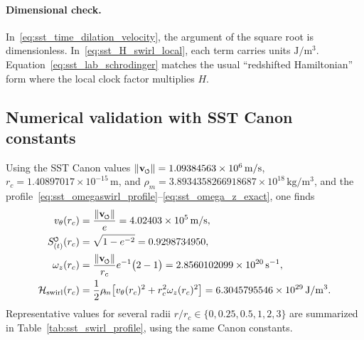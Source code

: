 \documentclass[11pt]{article}
\newcommand{\swirlarrow}{\mkern-2mu\scriptscriptstyle\boldsymbol{\circlearrowleft}}
\newcommand{\SwirlClock}{S_{(t)}^{\swirlarrow}}
\newcommand{\vnorm}{\lVert \mathbf{v}_{\mkern-2mu\scriptscriptstyle\boldsymbol{\circlearrowleft}} \rVert}               %
\newcommand{\rhoM}{\rho_{\!m}}   %
\newcommand{\rc}{r_c}                                    %
\begin{document}
        \paragraph{Dimensional check.}

            In~\eqref{eq:sst_time_dilation_velocity}, the argument of the square root is dimensionless. In~\eqref{eq:sst_H_swirl_local}, each term carries units \(\mathrm{J/m^3}\). Equation~\eqref{eq:sst_lab_schrodinger} matches the usual “redshifted Hamiltonian” form where the local clock factor multiplies \(H\).

    \subsection{Numerical validation with SST Canon constants}
    \label{subsec:sst_numerics}

    Using the SST Canon values \(\vnorm = 1.09384563\times10^{6}\,\mathrm{m/s}\), \(\rc = 1.40897017\times10^{-15}\,\mathrm{m}\), and \(\rhoM = 3.8934358266918687\times10^{18}\,\mathrm{kg/m^3}\), and the profile~\eqref{eq:sst_omegaswirl_profile}–\eqref{eq:sst_omega_z_exact}, one finds
    \[
        \begin{aligned}
            v_\theta(\rc)
            &= \frac{\vnorm}{e}
            = 4.02403\times10^{5}\,\mathrm{m/s},\\
            \SwirlClock(\rc)
            &= \sqrt{1-e^{-2}}
            = 0.9298734950,\\
            \omega_z(\rc)
            &= \frac{\vnorm}{\rc}e^{-1}\big(2-1\big)
            = 2.8560102099\times10^{20}\,\mathrm{s^{-1}},\\
            \mathcal{H}_{\text{swirl}}(\rc)
            &= \frac{1}{2}\rhoM
            \big[v_\theta(\rc)^2+\rc^2\omega_z(\rc)^2\big]
            = 6.3045795546\times10^{29}\,\mathrm{J/m^3}.
        \end{aligned}
    \]
    Representative values for several radii \(r/\rc\in\{0,0.25,0.5,1,2,3\}\) are summarized in Table~\ref{tab:sst_swirl_profile}, using the same Canon constants.
\end{document}
